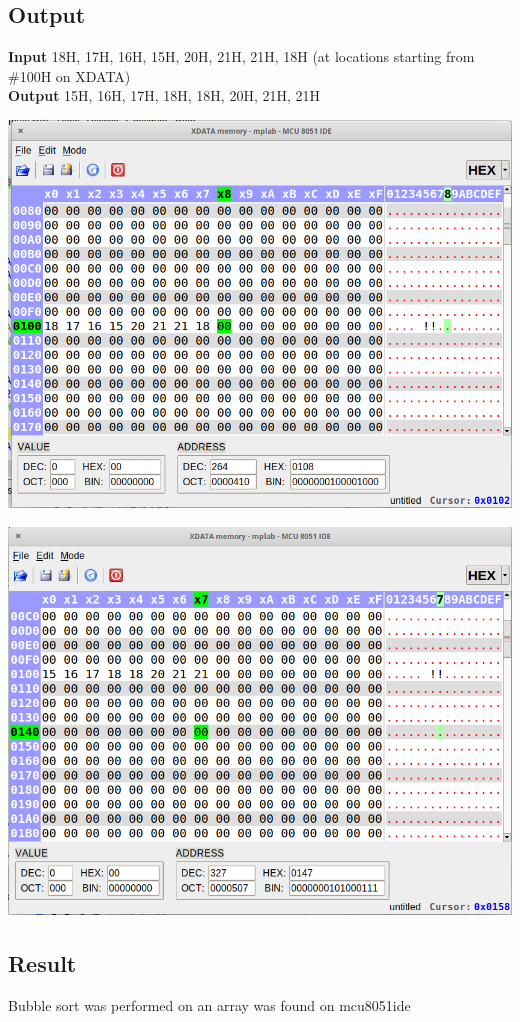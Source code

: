 \subsection{Output}
\textbf{Input} 18H, 17H, 16H, 15H, 20H, 21H, 21H, 18H (at locations starting from \#100H on XDATA)\\
\textbf{Output} 15H, 16H, 17H, 18H, 18H, 20H, 21H, 21H\\
\begin{center}
	\includegraphics[width=\textwidth]{img/p30/ss1.png}
\end{center}
\begin{center}
	\includegraphics[width=\textwidth]{img/p30/ss2.png}
\end{center}


\subsection{Result}
Bubble sort was performed on an array was found on mcu8051ide